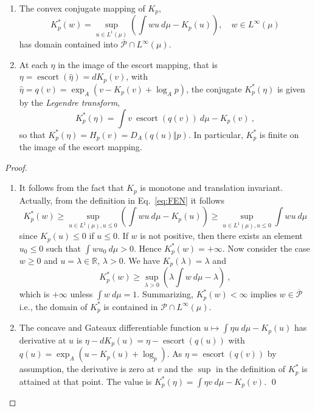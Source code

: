 \documentclass[graybox]{svmult}
\newcommand{\escortof}[1]{\operatorname{escort}\left(#1\right)}
\newcommand{\reals}{\mathbb{R}}
\begin{document}
\begin{proposition}
\begin{enumerate}
\item The convex conjugate mapping of $K_{p}$,
\begin{equation}\label{eq:FEN}
K_{p}^{\ast }\left( w\right) =\sup_{u\in L^{1}(\mu )}\left(\int wu\ d\mu
-K_{p}\left( u\right)\right), \quad w\in L^{\infty }(\mu )  
\end{equation}
has domain contained into $\overline{\mathcal P}\cap L^{\infty}(\mu)$.
\item At each $\eta$ in the image of the escort mapping, that is $\eta = \escortof{\hat \eta} = dK_p(v)$, with $\hat \eta = q(v) = \exp_A(v - K_p(v) + \log_A p)$, the conjugate $K_p^*(\eta)$ is given by the \emph{Legendre transform},
  \begin{equation*}
K_p^*(\eta) = \int v\ \escortof{q(v)} \ d\mu - K_p(v) \  ,    
\end{equation*}
so that $K_p^*(\eta)  = H_p(v) = D_A(q(u)\Vert p)$. In particular, $K_p^*$ is finite on the image of the escort mapping.
\end{enumerate}
\end{proposition}
%
\begin{proof}
\begin{enumerate} 
\item It follows from the fact that $K_{p}$ is monotone and translation invariant. Actually, from the definition in Eq.~\eqref{eq:FEN} it follows 
\begin{equation*}
K_{p}^{\ast }\left( w\right) \geq \sup_{u\in L^{1}(\mu ),u\leq 0}\left(\int wu\ d\mu -K_{p}\left(
u\right)\right) \geq \sup_{u\in L^{1}(\mu ),u\leq 0}\int wu\ d\mu
\end{equation*}
since $K_{p}\left( u\right) \leq 0$ if $u\leq 0.$ If $w$ is not positive,
then there exists an element $u_{0}\leq 0$ such that $\int wu_{0}\ d\mu >0$.
Hence $K_{p}^{\ast }\left( w\right) =+\infty .$ Now consider the case $w \geq 0$ and $u = \lambda \in \reals$, $\lambda >0$. We have $K_p(\lambda) = \lambda$ and 
\begin{equation*}
K_p^*(w) \geq \sup_{\lambda > 0}\left( \lambda \int w\ d\mu
-\lambda \right) \ ,
\end{equation*}
which is $+\infty$ unless $\int w \ d\mu = 1$.
Summarizing, $K_{p}^{\ast }\left( w\right) <\infty $ implies $w\in \overline{\mathcal{P}}$ i.e., the domain of $K_{p}^{\ast }$ is contained in $\mathcal{P\cap }L^{\infty }(\mu)$.

\item The concave and Gateaux differentiable function $u \mapsto \int \eta u \ d\mu - K_p(u)$ has derivative at $u$ is $\eta - dK_p(u) = \eta - \escortof{q(u)}$ with $q(u) = \exp_A(u - K_p(u) + \log_p)$. As $\eta = \escortof{q(v)}$ by assumption, the derivative is zero at $v$ and the $\sup$ in the definition of $K_p^*$ is attained at that point. The value is $K_p^*(\eta) = \int \eta v \ d\mu - K_p(v)$. \qed
\end{enumerate}
\end{proof}
\end{document}
